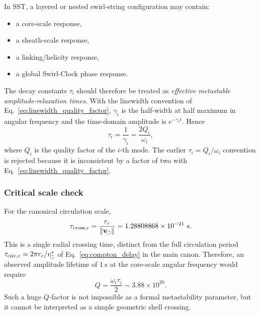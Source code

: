         In SST, a layered or nested swirl-string configuration may contain:
        \begin{itemize}
            \item a core-scale response,
            \item a sheath-scale response,
            \item a linking/helicity response,
            \item a global Swirl-Clock phase response.
        \end{itemize}
        The decay constants \(\tau_i\) should therefore be treated as
        \emph{effective metastable amplitude-relaxation times}.  With the linewidth
        convention of Eq.~\eqref{eq:linewidth_quality_factor},
        \(\gamma_i\) is the half-width at half maximum in angular frequency and the
        time-domain amplitude is \(e^{-\gamma_i t}\).  Hence
        \begin{equation}
            \boxed{
                \tau_i
                =
                \frac{1}{\gamma_i}
                =
                \frac{2Q_i}{\omega_i}
            },
            \label{eq:tau_Q_over_omega}
        \end{equation}
        where \(Q_i\) is the quality factor of the \(i\)-th mode.  The earlier
        \(\tau_i=Q_i/\omega_i\) convention is rejected because it is inconsistent by a
        factor of two with Eq.~\eqref{eq:linewidth_quality_factor}.
    
    \subsubsection*{Critical scale check}
        
        For the canonical circulation scale,
        \begin{equation}
            \tau_{\rm cross,c}
            =
            \frac{r_c}{\lVert\mathbf{v}_{\!\boldsymbol{\circlearrowleft}}\rVert}
            =
            1.28808868\times10^{-21}\ \mathrm{s}.
            \label{eq:core_crossing_time_numeric}
        \end{equation}
        This is a single radial crossing time, distinct from the full circulation
        period \(\tau_{\rm circ,c}=2\pi r_c/v_{\!\boldsymbol{\circlearrowleft}}^{\ast}\) of Eq.~\eqref{eq:compton_delay}
        in the main canon.
        Therefore, an observed amplitude lifetime of \(1\ \mathrm{s}\) at the
        core-scale angular frequency would require
        \begin{equation}
            Q
            =
            \frac{\omega_i\tau_i}{2}
            \sim
            3.88\times10^{20}.
            \label{eq:large_Q_warning}
        \end{equation}
        Such a huge \(Q\)-factor is not impossible as a formal metastability parameter, but it cannot be interpreted as a simple geometric shell crossing.
    
